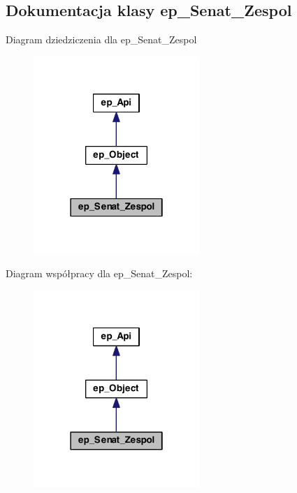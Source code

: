 \hypertarget{classep___senat___zespol}{\subsection{Dokumentacja klasy ep\-\_\-\-Senat\-\_\-\-Zespol}
\label{classep___senat___zespol}
}


Diagram dziedziczenia dla ep\-\_\-\-Senat\-\_\-\-Zespol\nopagebreak
\begin{figure}[H]
\begin{center}
\leavevmode
\includegraphics[width=178pt]{classep___senat___zespol__inherit__graph}
\end{center}
\end{figure}


Diagram współpracy dla ep\-\_\-\-Senat\-\_\-\-Zespol\-:\nopagebreak
\begin{figure}[H]
\begin{center}
\leavevmode
\includegraphics[width=178pt]{classep___senat___zespol__coll__graph}
\end{center}
\end{figure}

